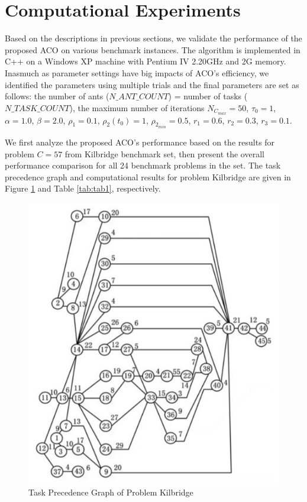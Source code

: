 \section{Computational Experiments}

Based on the descriptions in previous sections, we validate the performance of the proposed ACO on various benchmark instances.
The algorithm is implemented in C++ on a Windows XP machine with Pentium IV 2.20GHz and 2G memory. 
Inasmuch as parameter settings have big impacts of ACO's efficiency, we identified the parameters using multiple trials and the final parameters are set as follows: the number of ants ($N\_ANT\_COUNT$) = number of tasks ($N\_TASK\_COUNT$), the maximum number of iterations $N_{C_{max}} = 50$, $\tau_0 = 1$, $\alpha = 1.0$, $\beta = 2.0$, $\rho_1 = 0.1$, $\rho_2(t_0) = 1$, $\rho_{2_{min}} = 0.5$, $r_1 = 0.6$, $r_2 = 0.3$, $r_3 = 0.1$.

We first analyze the proposed ACO's performance based on the results for problem $C = 57$ from Kilbridge benchmark set, then present the overall performance comparison for all 24 benchmark problems in the set.
The task precedence graph and computational results for problem Kilbridge are given in Figure \ref{fig:fig1} and Table \ref{tab:tab1}, respectively.

\begin{figure}[h!]
	\begin{center}
		\includegraphics[width=0.6\linewidth]{sections/figure1.jpg}
		\caption{Task Precedence Graph of Problem Kilbridge}
		\label{fig:fig1}
	\end{center}
\end{figure}

